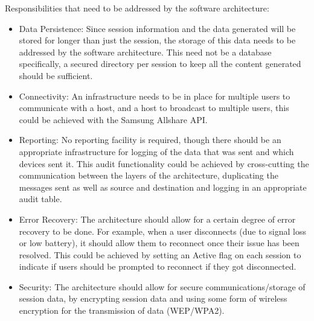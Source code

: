 \documentclass[12pt]{article}
\begin{document}
Responsibilities that need to be addressed by the software architecture:
\begin{itemize}
\item Data Persistence: Since session information and the data generated will be stored for longer than just the session, the storage of this data needs to be addressed by the software architecture. This need not be a database specifically, a secured directory per session to keep all the content generated should be sufficient.
\item Connectivity: An infrastructure needs to be in place for multiple users to communicate with a host, and a host to broadcast to multiple users, this could be achieved with the Samsung Allshare API.
\item Reporting: No reporting facility is required, though there should be an appropriate infrastructure for logging of the data that was sent and which devices sent it. This audit functionality could be achieved by cross-cutting the communication between the layers of the architecture, duplicating the messages sent as well as source and destination and logging in an appropriate audit table. 
\item Error Recovery: The architecture should allow for a certain degree of error recovery to be done. For example, when a user disconnects (due to signal loss or low battery), it should allow them to reconnect once their issue has been resolved. This could be achieved by setting an Active flag on each session to indicate if users should be prompted to reconnect if they got disconnected.
\item Security: The architecture should allow for secure communications/storage of session data, by encrypting session data and using some form of wireless encryption for the transmission of data (WEP/WPA2).



\end{itemize}
\newpage
\end{document}
